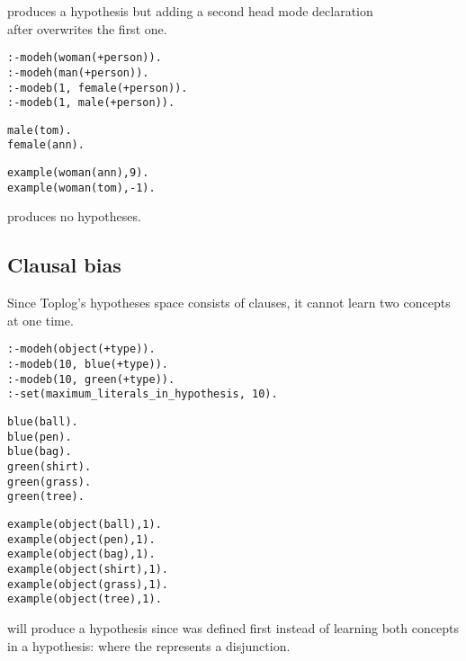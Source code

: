 produces a hypothesis  but adding a second
head mode declaration \\
 after  overwrites the first one.

\begin{minipage}[t]{.40\textwidth}
\begin{lstlisting}
:-modeh(woman(+person)).
:-modeh(man(+person)).
:-modeb(1, female(+person)).
:-modeb(1, male(+person)).
\end{lstlisting}
\end{minipage}
\begin{minipage}[t]{.20\textwidth}
\begin{lstlisting}
male(tom).
female(ann).
\end{lstlisting}
\end{minipage}
\begin{minipage}[t]{.20\textwidth}
\begin{lstlisting}
example(woman(ann),9).
example(woman(tom),-1).
\end{lstlisting}
\end{minipage}

produces no hypotheses.

\subsection{Clausal bias}
Since Toplog's hypotheses space consists of clauses, it cannot learn two concepts at one time.

\begin{lstlisting}
:-modeh(object(+type)).
:-modeb(10, blue(+type)).
:-modeb(10, green(+type)).
:-set(maximum_literals_in_hypothesis, 10).
\end{lstlisting}

\begin{minipage}[t]{.35\textwidth}
\begin{lstlisting}
blue(ball).
blue(pen).
blue(bag).
green(shirt).
green(grass).
green(tree).\end{lstlisting}
\end{minipage}
\begin{minipage}[t]{.20\textwidth}
\begin{lstlisting}
example(object(ball),1).
example(object(pen),1).
example(object(bag),1).
example(object(shirt),1).
example(object(grass),1).
example(object(tree),1).
\end{lstlisting}
\end{minipage}

will produce a hypothesis  since 
 was defined first instead of learning both
concepts in a hypothesis:
 where the \tc{;} represents a disjunction.
